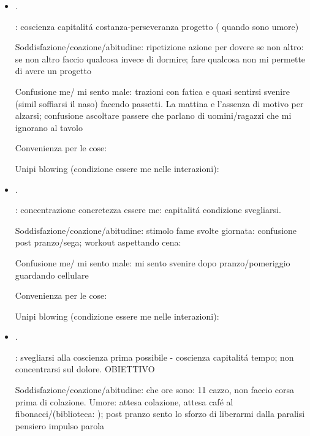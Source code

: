 \begin{itemize}
Confusione me/ mi sento male: sono a mensa dopo workout: attimo di spaesamento-insicurezza, zuppa e prendo l'insalata ma dimentico yougurt per mia i9nsoddisfazione, stallo loquor; 

Convenienza per le cose:

Unipi blowing (condizione essere me nelle interazioni):

\item {}.

: coscienza capitalit\'a costanza-perseveranza progetto ( quando sono umore)

Soddisfazione/coazione/abitudine: ripetizione azione per dovere se non altro: se non altro faccio qualcosa invece di dormire; fare qualcosa non mi permette di avere un progetto

Confusione me/ mi sento male: trazioni con fatica e quasi sentirsi svenire (simil soffiarsi il naso) facendo passetti. La mattina e l'assenza di motivo per alzarsi; confusione ascoltare passere che parlano di uomini/ragazzi che mi ignorano al tavolo

Convenienza per le cose:

Unipi blowing (condizione essere me nelle interazioni):

\item {}.

: concentrazione concretezza essere me: capitalit\'a condizione svegliarsi.

Soddisfazione/coazione/abitudine: stimolo fame svolte giornata: confusione post pranzo/sega; workout aspettando cena: 

Confusione me/ mi sento male: mi sento svenire dopo pranzo/pomeriggio guardando cellulare

Convenienza per le cose:

Unipi blowing (condizione essere me nelle interazioni):

\item {}.

: svegliarsi alla coscienza prima possibile - coscienza capitalit\'a tempo; non concentrarsi sul dolore. OBIETTIVO

Soddisfazione/coazione/abitudine: che ore sono: 11 cazzo, non faccio corsa prima di colazione. Umore: attesa colazione, attesa caf\'e al fibonacci/(biblioteca: ); post pranzo sento lo sforzo di liberarmi dalla paralisi pensiero impulso parola


\end{itemize}
